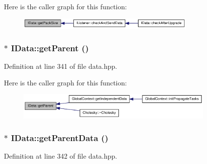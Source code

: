 Here is the caller graph for this function:\nopagebreak
\begin{figure}[H]
\begin{center}
\leavevmode
\includegraphics[width=249pt]{class_i_data_a98eb397df8b3cd27711801cb4c9e14ed_icgraph}
\end{center}
\end{figure}
\hypertarget{class_i_data_af014d3691bd00c551cf4a36371ef80ec}{
\subsubsection[{getParent}]{$\ast$ IData::getParent ()}}
\label{class_i_data_af014d3691bd00c551cf4a36371ef80ec}


Definition at line 341 of file data.hpp.

Here is the caller graph for this function:\nopagebreak
\begin{figure}[H]
\begin{center}
\leavevmode
\includegraphics[width=275pt]{class_i_data_af014d3691bd00c551cf4a36371ef80ec_icgraph}
\end{center}
\end{figure}
\hypertarget{class_i_data_a44b0310e7c4e7ddd9a9656f857b7d382}{
\subsubsection[{getParentData}]{$\ast$ IData::getParentData ()}}
\label{class_i_data_a44b0310e7c4e7ddd9a9656f857b7d382}


Definition at line 342 of file data.hpp.

